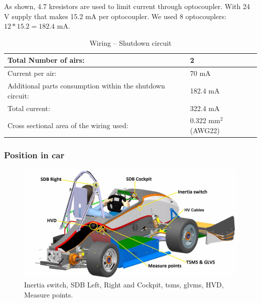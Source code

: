 As shown, 4.7 k\ohm resistors are used to limit current through optocoupler. With 24 V supply that makes 15.2 mA per optocoupler. We used 8 optocouplers: $12*15.2= 182.4$ mA.
\begin{table}[H]
	\centering
	\caption{Wiring – Shutdown circuit}
	\begin{tabu}{|X|X|}
		\hline
		Total Number of \glspl{air}: & 2 \\
		\hline
		Current per \gls{air}: & 70 mA \\
		\hline
		Additional parts consumption within the shutdown circuit: & 182.4 mA \\
		\hline
		Total current: & 322.4 mA \\
		\hline
		Cross sectional area of the wiring used: & 0.322 mm$^2$ (AWG22) \\
		\hline
	\end{tabu}%
	\label{tab:SDC-Wiring}%
\end{table}%


\subsubsection{Position in car}

\begin{figure}[H]
	\includegraphics[width=\textwidth]{./img/car-pos.jpg}
	\caption{Inertia switch, SDB Left, Right and Cockpit, \gls{tsms}, \gls{glvms}, HVD, Measure points.}
	\label{fig:SDC-positionInCar}
\end{figure}